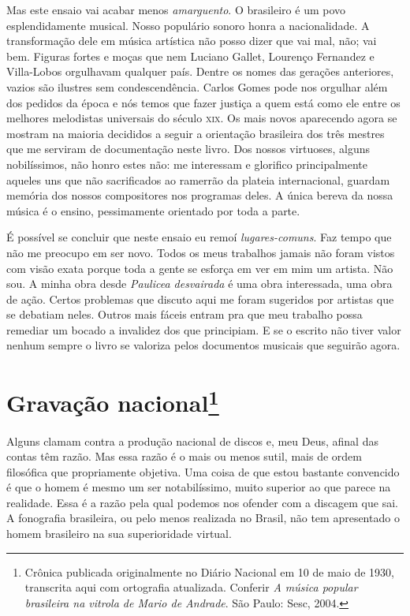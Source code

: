 Mas este ensaio vai acabar menos \textit{amarguento}. O brasileiro é um povo
esplendidamente musical. Nosso populário sonoro honra a nacionalidade. A
transformação dele em música artística não posso dizer que vai mal, não;
vai bem. Figuras fortes e moças que nem Luciano Gallet, Lourenço
Fernandez e Villa-Lobos orgulhavam qualquer país. Dentre os nomes das
gerações anteriores, vazios são ilustres sem condescendência. Carlos
Gomes pode nos orgulhar além dos pedidos da época e nós temos que fazer
justiça a quem está como ele entre os melhores melodistas universais do
século \textsc{xix}. Os mais novos aparecendo agora se mostram na maioria decididos
a seguir a orientação brasileira dos três mestres que me serviram de
documentação neste livro. Dos nossos virtuoses, alguns nobilíssimos, não
honro estes não: me interessam e glorifico principalmente aqueles uns
que não sacrificados ao ramerrão da plateia internacional, guardam
memória dos nossos compositores nos programas deles. A única bereva da
nossa música é o ensino, pessimamente orientado por toda a parte.

É possível se concluir que neste ensaio eu remoí \textit{lugares-comuns}. Faz
tempo que não me preocupo em ser novo. Todos os meus trabalhos jamais
não foram vistos com visão exata porque toda a gente se esforça em ver
em mim um artista. Não sou. A minha obra desde \textit{Paulicea desvairada} é
uma obra interessada, uma obra de ação. Certos problemas que discuto
aqui me foram sugeridos por artistas que se debatiam neles. Outros mais
fáceis entram pra que meu trabalho possa remediar um bocado a invalidez
dos que principiam. E se o escrito não tiver valor nenhum sempre o livro
se valoriza pelos documentos musicais que seguirão agora.


\chapter{Gravação nacional\footnote{Crônica publicada originalmente no Diário Nacional em 10 de maio de 1930, transcrita aqui com ortografia atualizada. Conferir \textit{A música popular brasileira na vitrola de Mario de Andrade}. São Paulo: Sesc, 2004.}}


Alguns clamam contra a produção nacional de discos e, meu Deus, afinal
das contas têm razão. Mas essa razão é o mais ou menos sutil, mais de
ordem filosófica que propriamente objetiva. Uma coisa de que estou
bastante convencido é que o homem é mesmo um ser notabilíssimo, muito
superior ao que parece na realidade. Essa é a razão pela qual podemos
nos ofender com a discagem que sai. A fonografia brasileira, ou pelo
menos realizada no Brasil, não tem apresentado o homem brasileiro na sua
superioridade virtual.

